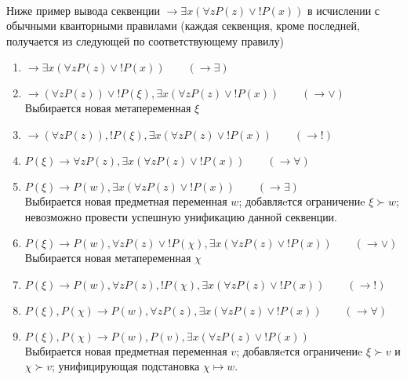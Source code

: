 \documentclass{cw1}
\begin{document}

\paragraph{}
Ниже пример вывода секвенции  $\rightarrow \exists x (\forall z P(z) \vee !P(x))$ в исчислении с обычными
кванторными правилами (каждая секвенция, кроме последней, получается из следующей по соответствующему
правилу)

\begin{enumerate}
 \item $ \rightarrow \exists x (\forall z P(z) \vee !P(x)) \qquad (\rightarrow \exists)$
 \item $ \rightarrow (\forall z P(z)) \vee !P(\xi), \exists x (\forall z P(z) \vee !P(x))  \qquad (\rightarrow \vee)$\\
 Выбирается новая метапеременная $\xi$
 \item $ \rightarrow (\forall z P(z)), !P(\xi), \exists x (\forall z P(z) \vee !P(x))  \qquad (\rightarrow !)$
 \item $P(\xi) \rightarrow \forall z P(z), \exists x (\forall z P(z) \vee !P(x))  \qquad (\rightarrow \forall)$
 \item $P(\xi) \rightarrow P(w), \exists x (\forall z P(z) \vee !P(x))  \qquad (\rightarrow \exists)$\\
 Выбирается новая предметная переменная $w$; добавляeтся ограничениe $\xi \succ w$;
 невозможно провести успешную унификацию данной секвенции.
 \item $P(\xi) \rightarrow P(w), \forall z P(z) \vee !P(\chi), \exists x (\forall z P(z) \vee !P(x))  \qquad (\rightarrow \vee)$\\
 Выбирается новая метапеременная $\chi$
 \item $P(\xi) \rightarrow P(w), \forall z P(z), !P(\chi), \exists x (\forall z P(z) \vee !P(x))  \qquad (\rightarrow !)$
 \item $P(\xi), P(\chi) \rightarrow P(w), \forall z P(z), \exists x (\forall z P(z) \vee !P(x)) \qquad (\rightarrow \forall)$
 \item $P(\xi), P(\chi) \rightarrow P(w), P(v), \exists x (\forall z P(z) \vee !P(x))$ \\
 Выбирается новая предметная переменная $v$; добавляeтся ограничениe $\xi \succ v$ и $\chi \succ v$;
 унифицирующая подстановка $\chi \mapsto w $.\\
\end{enumerate}
\end{document}
